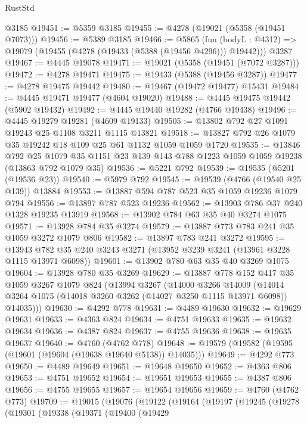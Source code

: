\begin{lexlean}{RustStd}
\begin{coremodule}
    @3185
@19451 := @5359 @3185
@19455 := @4278 (@19021 (@5358 (@19451 @7073)))
@19456 := @5389 @3185
@19466 := @5865
    (fun (bodyL : @4312) => @19079 (@19455 (@4278 (@19433 (@5388 (@19456 @4296))) @19442)))
    @3287
@19467 := @4445 @19078
@19471 := @19021 (@5358 (@19451 (@7072 @3287)))
@19472 := @4278 @19471
@19475 := @19433 (@5388 (@19456 @3287))
@19477 := @4278 @19475 @19442
@19480 := @19467 (@19472 @19477) @15431
@19484 := @4445 @19471 @19477 (@4604 @19020)
@19488 := @4445 @19475 @19442 (@5902 @19432)
@19492 := @4445 @19440 @19282 (@4766 @19438)
@19496 := @4445 @19279 @19281 (@4609 @19133)
@19505 := @13802 @792 @27 @1091 @19243 @25 @1108 @3211 @1115 @13821
@19518 := @13827 @792 @26 @1079 @35 @19242 @18 @109 @25 @61 @1132 @1059 @1059 @1720
@19535 := @13846
    @792
    @25
    @1079
    @35
    @1151
    @23
    @139
    @143
    @788
    @1223
    @1059
    @1059
    @19238
    (@13863 @792 @1079 @35)
@19536 := @5221 @792
@19539 := @19535 (@5201 (@19536 @23))
@19540 := @5979 @792
@19545 := @19539 (@4766 (@19540 @25 @139)) @13884
@19553 := @13887 @594 @787 @523 @35 @1059 @19236 @1079 @794
@19556 := @13897 @787 @523 @19236
@19562 := @13903 @786 @37 @240 @1328 @19235 @13919
@19568 := @13902 @784 @63 @35 @40 @3274 @1075
@19571 := @13928 @784 @35 @3274
@19579 := @13887 @773 @783 @241 @35 @1059 @3272 @1079 @806
@19582 := @13897 @783 @241 @3272
@19595 := @13943 @782 @35 @240 @3243 @3271 (@13952 @3239 @3241 (@13961 @3228 @1115 @13971 @6098))
@19601 := @13902 @780 @63 @35 @40 @3269 @1075
@19604 := @13928 @780 @35 @3269
@19629 := @13887
    @778
    @152
    @417
    @35
    @1059
    @3267
    @1079
    @824
    (@13994
      @3267
      (@14000
        @3266
        @14009
        (@14014 @3264 @1075 (@14018 @3260 @3262 (@14027 @3250 @1115 @13971 @6098)) @14035)))
@19630 := @4292 @778
@19631 := @4489 @19630
@19632 := @19629 @19631
@19633 := @4363 @824
@19634 := @4751 @19633
@19635 := @19632 @19634
@19636 := @4387 @824
@19637 := @4755 @19636
@19638 := @19635 @19637
@19640 := @4760 (@4762 @778)
@19648 := @19579 (@19582 (@19595 (@19601 (@19604 (@19638 @19640 @5138)) @14035)))
@19649 := @4292 @773
@19650 := @4489 @19649
@19651 := @19648 @19650
@19652 := @4363 @806
@19653 := @4751 @19652
@19654 := @19651 @19653
@19655 := @4387 @806
@19656 := @4755 @19655
@19657 := @19654 @19656
@19659 := @4760 (@4762 @773)
@19709 := @19015
    (@19076
      (@19122
        (@19164
          (@19197
            (@19245
              (@19278
                (@19301
                  (@19338
                    (@19371
                      (@19400
                        (@19429

\end{coremodule}
\end{lexlean}
